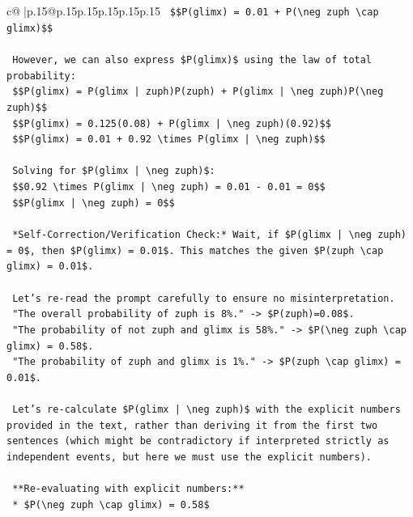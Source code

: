 \documentclass{article}
\begin{document}
{\begin{supertabular}{c@{$\;$}|p{.15\linewidth}@{}p{.15\linewidth}p{.15\linewidth}p{.15\linewidth}p{.15\linewidth}p{.15\linewidth}}
{{{\texttt{    \$\$P(glimx) = 0.01 + P(\textbackslash{}neg zuph \textbackslash{}cap glimx)\$\$} \\
\\ 
\texttt{    However, we can also express \$P(glimx)\$ using the law of total probability:} \\
\texttt{    \$\$P(glimx) = P(glimx | zuph)P(zuph) + P(glimx | \textbackslash{}neg zuph)P(\textbackslash{}neg zuph)\$\$} \\
\texttt{    \$\$P(glimx) = 0.125(0.08) + P(glimx | \textbackslash{}neg zuph)(0.92)\$\$} \\
\texttt{    \$\$P(glimx) = 0.01 + 0.92 \textbackslash{}times P(glimx | \textbackslash{}neg zuph)\$\$} \\
\\ 
\texttt{    Solving for \$P(glimx | \textbackslash{}neg zuph)\$:} \\
\texttt{    \$\$0.92 \textbackslash{}times P(glimx | \textbackslash{}neg zuph) = 0.01 {-} 0.01 = 0\$\$} \\
\texttt{    \$\$P(glimx | \textbackslash{}neg zuph) = 0\$\$} \\
\\ 
\texttt{    *Self{-}Correction/Verification Check:* Wait, if \$P(glimx | \textbackslash{}neg zuph) = 0\$, then \$P(glimx) = 0.01\$. This matches the given \$P(zuph \textbackslash{}cap glimx) = 0.01\$.} \\
\\ 
\texttt{    Let's re{-}read the prompt carefully to ensure no misinterpretation.} \\
\texttt{    "The overall probability of zuph is 8\%." {-}> \$P(zuph)=0.08\$.} \\
\texttt{    "The probability of not zuph and glimx is 58\%." {-}> \$P(\textbackslash{}neg zuph \textbackslash{}cap glimx) = 0.58\$.} \\
\texttt{    "The probability of zuph and glimx is 1\%." {-}> \$P(zuph \textbackslash{}cap glimx) = 0.01\$.} \\
\\ 
\texttt{    Let's re{-}calculate \$P(glimx | \textbackslash{}neg zuph)\$ with the explicit numbers provided in the text, rather than deriving it from the first two sentences (which might be contradictory if interpreted strictly as independent events, but here we must use the explicit numbers).} \\
\\ 
\texttt{    **Re{-}evaluating with explicit numbers:**} \\
\texttt{    *   \$P(\textbackslash{}neg zuph \textbackslash{}cap glimx) = 0.58\$} \\
}}}
\end{supertabular}}
\end{document}
